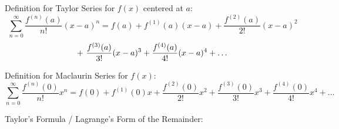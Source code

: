 %
%
%
%
%
%
%
%
%
%
%
%

\pagestyle{empty}


%

{\sc Definition for Taylor Series for \(f(x)\) centered at \(a\):}
\vspace*{-.1in}
\[
\sum_{n=0}^\infty \frac{f^{(n)}(a)}{n!}(x-a)^n  =  f(a) + f^{(1)}(a)(x-a) + \frac{f^{(2)}(a)}{2!}(x-a)^2
\]
\[
   +\ \frac{f^{(3)}(a)}{3!}(x-a)^3+\frac{f^{(4)}(a)}{4!}(x-a)^4+\ldots\\
\]


{\sc Definition for Maclaurin Series for \(f(x)\):}
\vspace*{-.1in}
\[
\sum_{n=0}^\infty \frac{f^{(n)}(0)}{n!}x^n  =  f(0) + f^{(1)}(0)x 
+ \frac{f^{(2)}(0)}{2!}x^2 + \frac{f^{(3)}(0)}{3!}x^3+\frac{f^{(4)}(0)}{4!}x^4+\ldots
\]

\vspace*{-.2in}
{\sc Taylor's Formula / Lagrange's Form of the Remainder:}

